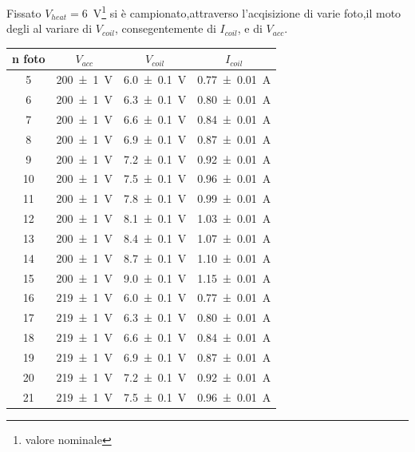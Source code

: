 	Fissato $V_{heat}=$\SI{6}{\volt}\footnote{valore nominale} si è campionato,attraverso l'acqisizione di varie foto,il moto degli \e al variare di $V_{coil}$, consegentemente di $I_{coil}$, e di $V_{acc}$.
	\begin{table}[hb]
		\centering
		\begin{tabular}{|c|c|c|c|}
			\toprule
			n foto & 	$V_{acc}$  & 	$V_{coil}$ & $I_{coil}$ \\
			\midrule
			5 & \SI{200 \pm 1}{\volt} &\SI{6.0 \pm 0.1}{\volt} & \SI{0.77 \pm 0.01}{\ampere}\\
			6 & \SI{200 \pm 1}{\volt} &\SI{6.3 \pm 0.1}{\volt} & \SI{0.80 \pm 0.01}{\ampere}\\
			7 & \SI{200 \pm 1}{\volt} &\SI{6.6 \pm 0.1}{\volt} & \SI{0.84 \pm 0.01}{\ampere}\\
			8 & \SI{200 \pm 1}{\volt} &\SI{6.9 \pm 0.1}{\volt} & \SI{0.87 \pm 0.01}{\ampere}\\
			9 & \SI{200 \pm 1}{\volt} &\SI{7.2 \pm 0.1}{\volt} & \SI{0.92 \pm 0.01}{\ampere}\\
			10 & \SI{200 \pm 1}{\volt} &\SI{7.5 \pm 0.1}{\volt} & \SI{0.96 \pm 0.01}{\ampere}\\
			11 & \SI{200 \pm 1}{\volt} &\SI{7.8 \pm 0.1}{\volt} & \SI{0.99 \pm 0.01}{\ampere}\\
			12 & \SI{200 \pm 1}{\volt} &\SI{8.1 \pm 0.1}{\volt} & \SI{1.03 \pm 0.01}{\ampere}\\
			13 & \SI{200 \pm 1}{\volt} &\SI{8.4 \pm 0.1}{\volt} & \SI{1.07 \pm 0.01}{\ampere}\\
			14 & \SI{200 \pm 1}{\volt} &\SI{8.7 \pm 0.1}{\volt} & \SI{1.10 \pm 0.01}{\ampere}\\
			15 & \SI{200 \pm 1}{\volt} &\SI{9.0 \pm 0.1}{\volt} & \SI{1.15 \pm 0.01}{\ampere}\\
			16 & \SI{219 \pm 1}{\volt} &\SI{6.0 \pm 0.1}{\volt} & \SI{0.77 \pm 0.01}{\ampere}\\
			17 & \SI{219 \pm 1}{\volt} &\SI{6.3 \pm 0.1}{\volt} & \SI{0.80 \pm 0.01}{\ampere}\\
			18 & \SI{219 \pm 1}{\volt} &\SI{6.6 \pm 0.1}{\volt} & \SI{0.84 \pm 0.01}{\ampere}\\
			19 & \SI{219 \pm 1}{\volt} &\SI{6.9 \pm 0.1}{\volt} & \SI{0.87 \pm 0.01}{\ampere}\\
			20 & \SI{219 \pm 1}{\volt} &\SI{7.2 \pm 0.1}{\volt} & \SI{0.92 \pm 0.01}{\ampere}\\
			21 & \SI{219 \pm 1}{\volt} &\SI{7.5 \pm 0.1}{\volt} & \SI{0.96 \pm 0.01}{\ampere}\\

\end{tabular}
\end{table}
